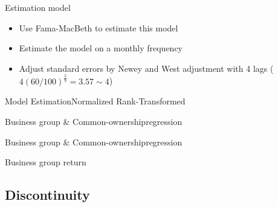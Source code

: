 \documentclass{beamer}
\begin{document}
	
	
	\begin{frame}{Estimation model}
		\begin{itemize}
			\item Use Fama-MacBeth to estimate this model
			
			
			\item Estimate the model on a monthly frequency 
			\item Adjust standard errors by Newey and West adjustment with 4 lags ($ 4(60/100)^{\frac{2}{9}} = 3.57 \sim 4 $)
		\end{itemize}
	\end{frame}
	
	\begin{frame}{Model Estimation}{Normalized Rank-Transformed}
		\label{Monthly15} 
		\begin{table}[htbp]
			\centering
			\resizebox{1\textheight}{!}{
				
			}
		\end{table}
		
		
	\end{frame}
	
	

\begin{frame}{Business group \& Common-ownership}{regression}
	\begin{table}[htbp]
		\centering
		\resizebox{0.7\textwidth}{!}{
			
		}
	\end{table}
\end{frame}

\begin{frame}{Business group \& Common-ownership}{regression}
	\begin{table}[htbp]
		\centering
		\resizebox{0.7\textwidth}{!}{
			
		}
	\end{table}
\end{frame}

	\begin{frame}{Business group return}
	
	\begin{table}[htbp]
		\centering
		\resizebox{0.6\textwidth}{!}{
			
		}
	\end{table}
\end{frame}
	
	\subsection{Discontinuity}
	
\end{document}
